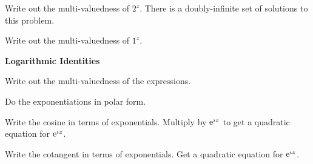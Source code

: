 {%
\begin{Hint}
  \label{hint 2 in 2z}
  Write out the multi-valuedness of $2^z$.  There is a doubly-infinite set of 
  solutions to this problem.
\end{Hint}


\begin{Hint}
  \label{hint 1 in 1z}
  Write out the multi-valuedness of $1^z$.
\end{Hint}





\begin{large}
  \noindent
  \textbf{Logarithmic Identities}
\end{large}




\begin{Hint}
  \label{hint Log z1z2}
\end{Hint}





\begin{Hint}
  \label{hint log-1 = 0}
  Write out the multi-valuedness of the expressions.
\end{Hint}





\begin{Hint}
  \label{hint mod-arg cart log}
  Do the exponentiations in polar form.
\end{Hint}



\begin{Hint}
  \label{hint cosz = 69}
  Write the cosine in terms of exponentials.  Multiply by $\mathop{\mathrm{e}}\nolimits^{\imath z}$ to get 
  a quadratic equation for $\mathop{\mathrm{e}}\nolimits^{\imath z}$.
\end{Hint}


\begin{Hint}
  \label{hint cotz = i47}
  Write the cotangent in terms of exponentials.  Get a quadratic equation for
  $\mathop{\mathrm{e}}\nolimits^{\imath z}$.
\end{Hint}




\begin{Hint}
  \label{hint log-i}
\end{Hint}





}
